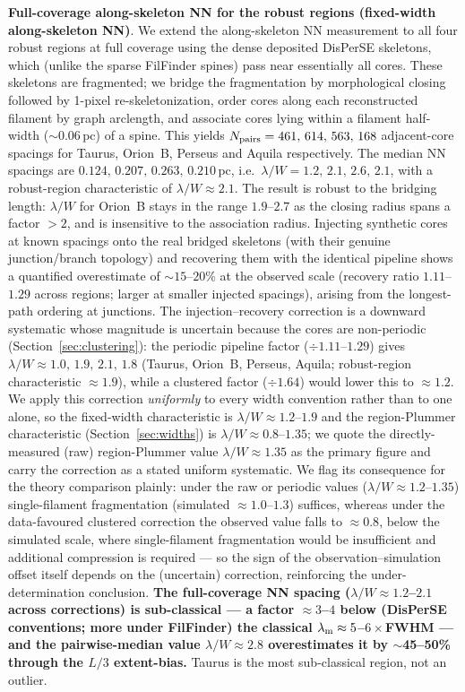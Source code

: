 \documentclass[usenatbib,twoside,twocolumn]{mnras}
\begin{document}
\textbf{Full-coverage along-skeleton NN for the robust regions (fixed-width along-skeleton NN)}. We extend the along-skeleton NN measurement to all four robust regions at full coverage using the dense deposited DisPerSE skeletons, which (unlike the sparse FilFinder spines) pass near essentially all cores. These skeletons are fragmented; we bridge the fragmentation by morphological closing followed by 1-pixel re-skeletonization, order cores along each reconstructed filament by graph arclength, and associate cores lying within a filament half-width ($\sim$0.06\,pc) of a spine. This yields $N_{\rm pairs} = 461,\,614,\,563,\,168$ adjacent-core spacings for Taurus, Orion~B, Perseus and Aquila respectively. The median NN spacings are $0.124,\,0.207,\,0.263,\,0.210$\,pc, i.e.\ $\lambda/W = 1.2,\,2.1,\,2.6,\,2.1$, with a robust-region characteristic of $\lambda/W \approx 2.1$. The result is robust to the bridging length: $\lambda/W$ for Orion~B stays in the range $1.9$--$2.7$ as the closing radius spans a factor $>2$, and is insensitive to the association radius. Injecting synthetic cores at known spacings onto the real bridged skeletons (with their genuine junction/branch topology) and recovering them with the identical pipeline shows a quantified overestimate of $\sim$$15$--$20$\% at the observed scale (recovery ratio $1.11$--$1.29$ across regions; larger at smaller injected spacings), arising from the longest-path ordering at junctions. The injection--recovery correction is a downward systematic whose magnitude is uncertain because the cores are non-periodic (Section~\ref{sec:clustering}): the periodic pipeline factor ($\div1.11$--$1.29$) gives $\lambda/W\approx1.0,\,1.9,\,2.1,\,1.8$ (Taurus, Orion~B, Perseus, Aquila; robust-region characteristic $\approx1.9$), while a clustered factor ($\div1.64$) would lower this to $\approx1.2$. We apply this correction \emph{uniformly} to every width convention rather than to one alone, so the fixed-width characteristic is $\lambda/W\approx1.2$--$1.9$ and the region-Plummer characteristic (Section~\ref{sec:widths}) is $\lambda/W\approx0.8$--$1.35$; we quote the directly-measured (raw) region-Plummer value $\lambda/W\approx1.35$ as the primary figure and carry the correction as a stated uniform systematic. We flag its consequence for the theory comparison plainly: under the raw or periodic values ($\lambda/W\approx1.2$--$1.35$) single-filament fragmentation (simulated $\approx1.0$--$1.3$) suffices, whereas under the data-favoured clustered correction the observed value falls to $\approx0.8$, below the simulated scale, where single-filament fragmentation would be insufficient and additional compression is required --- so the sign of the observation--simulation offset itself depends on the (uncertain) correction, reinforcing the under-determination conclusion. \textbf{The full-coverage NN spacing ($\lambda/W\approx1.2$--$2.1$ across corrections) is sub-classical --- a factor $\approx3$--$4$ below (DisPerSE conventions; more under FilFinder) the classical $\lambda_{\rm m}\approx5$--$6\times$FWHM --- and the pairwise-median value $\lambda/W\approx2.8$ overestimates it by $\sim$45--50\% through the $L/3$ extent-bias.} Taurus is the most sub-classical region, not an outlier.
\end{document}
